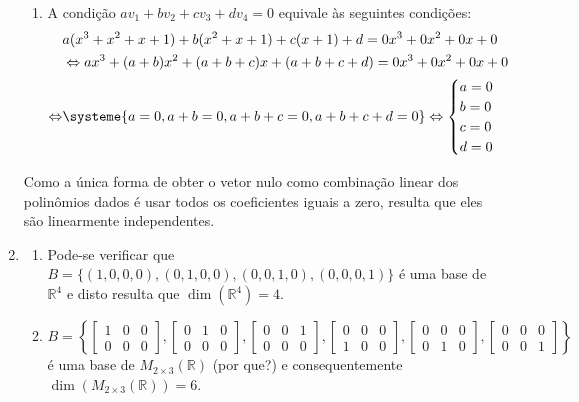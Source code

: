 \documentclass[12pt,a4paper]{article}
\newcommand*\R{\mathbb{R}}
\begin{document}
\begin{enumerate}
\begin{enumerate}
\item A condição $a v_1 + b v_2 + c v_3 + d v_4 = 0$ equivale às seguintes condições:
\begin{align*}
& a ( x^3 + x^2 + x + 1 ) + b ( x^2 + x + 1 ) + c (x + 1) + d 
= 0 x^3 + 0 x^2 + 0 x + 0 \\
& \Leftrightarrow
a x^3 + (a+b) x^2 + (a+b+c)x + (a+b+c+d) = 0 x^3 + 0 x^2 + 0 x + 0 \\
\Leftrightarrow
& 
\systeme{
a=0,
a+b=0,
a+b+c=0,
a+b+c+d=0
}
\Leftrightarrow
\begin{cases}
a=0\\
b=0\\
c=0\\
d=0
\end{cases}
\end{align*}
\end{enumerate}
Como a única forma de obter o vetor nulo como combinação linear dos polinômios dados é usar todos os coeficientes iguais a zero, resulta que eles são linearmente independentes.


\item
\begin{enumerate}
\item Pode-se verificar que $B = \{ (1,0,0,0), (0,1,0,0), (0,0,1,0), (0,0,0,1) \}$ é uma base de $\R^4$ e disto resulta que $\dim( \R^4 ) = 4$.
\item $B = \left\{
\begin{bmatrix}
1 & 0 & 0 \\0 & 0 & 0
\end{bmatrix},
\begin{bmatrix}
0 & 1 & 0 \\0 & 0 & 0
\end{bmatrix},
\begin{bmatrix}
0 & 0 & 1 \\0 & 0 & 0
\end{bmatrix},
\begin{bmatrix}
0 & 0 & 0 \\1 & 0 & 0
\end{bmatrix},
\begin{bmatrix}
0 & 0 & 0 \\0 & 1 & 0
\end{bmatrix},
\begin{bmatrix}
0 & 0 & 0 \\0 & 0 & 1
\end{bmatrix}
\right\}$ é uma base de $M_{2 \times 3}(\R)$ (por que?) e consequentemente $\dim( M_{2 \times 3}(\R) ) = 6$.


\end{enumerate}
\end{enumerate}
\end{document}
